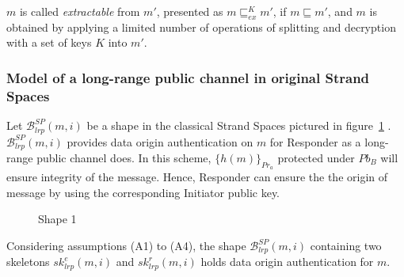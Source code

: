 \begin{Definition}[Extractable]
$m$ is called \emph{extractable} from $m'$, presented as $m \sqsubseteq^K_{ex} m'$, if $m \sqsubseteq m'$, and $m$ is obtained by applying a limited number of operations of splitting and decryption with a set of keys $K$ into $m'$.
\end{Definition}

\subsubsection*{Model of a long-range public channel in original Strand Spaces}\label{longrange}

Let $\mathcal{B}^{SP}_{lrp}(m,i)$ be a shape in the classical Strand Spaces pictured in figure~\ref{protocol1} . $\mathcal{B}^{SP}_{lrp}(m,i)$ provides data origin authentication on $m$ for Responder as a long-range public channel does. In this scheme, $\{h(m)\}_{Pr_a}$ protected under $Pb_B$ will ensure integrity of the message. Hence, Responder can ensure the the origin of message by using the corresponding Initiator public key. 

\begin{figure}
\begin{center}
\end{center}
\caption{Shape 1} 
\label{protocol1}
\end{figure}

\begin{Proposition}
Considering assumptions (A1) to (A4), the shape $\mathcal{B}^{SP}_{lrp}(m,i)$ containing two skeletons $sk^e_{lrp}(m,i)$ and $sk^r_{lrp}(m,i)$ holds data origin authentication for $m$. 
\end{Proposition}

